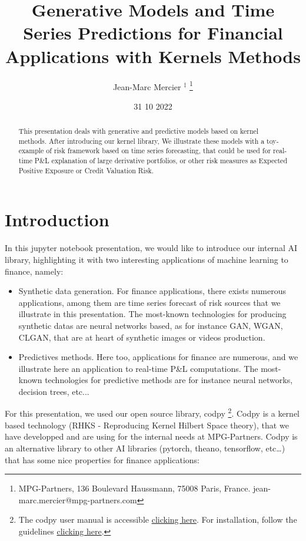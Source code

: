 \documentclass[]{article}
\title{Generative Models and Time Series Predictions for Financial Applications
with Kernels Methods}
\author{Jean-Marc Mercier \(^\ddag\)
\footnote{MPG-Partners, 136 Boulevard Haussmann, 75008 Paris, France. jean-marc.mercier@mpg-partners.com}}
\date{31 10 2022}
\numberwithin{equation}{section}
\begin{document}
\maketitle
\begin{abstract}
This presentation deals with generative and predictive models based on
kernel methods. After introducing our kernel library, We illustrate
these models with a toy-example of risk framework based on time series
forecasting, that could be used for real-time P\&L explanation of large
derivative portfolios, or other risk measures as Expected Positive
Exposure or Credit Valuation Risk.
\end{abstract}

\section{Introduction}\label{introduction}

In this jupyter notebook presentation, we would like to introduce our
internal AI library, highlighting it with two interesting applications
of machine learning to finance, namely:

\begin{itemize}
\item Synthetic data generation. For finance applications, there exists numerous applications, among them are time series forecast of risk sources that we illustrate in this presentation. The most-known technologies for producing synthetic datas are neural networks based, as for instance GAN, WGAN, CLGAN, that are at heart of synthetic images or videos production.
\item Predictives methods. Here too, applications for finance are numerous, and we illustrate here an application to real-time P\&L computations. The most-known technologies for predictive methods are for instance neural networks, decision trees, etc...
\end{itemize}

For this presentation, we used our open source library, codpy
\footnote{The codpy user manual is accessible 
\href{https://papers.ssrn.com/sol3/papers.cfm?abstract_id=4077158}{clicking here}. For installation, follow the guidelines \href{https://pypi.org/project/codpy/}{clicking here}.}.
Codpy is a kernel based technology (RHKS - Reproducing Kernel Hilbert
Space theory), that we have developped and are using for the internal
needs at MPG-Partners. Codpy is an alternative library to other AI
libraries (pytorch, theano, tensorflow, etc\ldots{}) that has some nice
properties for finance applications:
\end{document}
